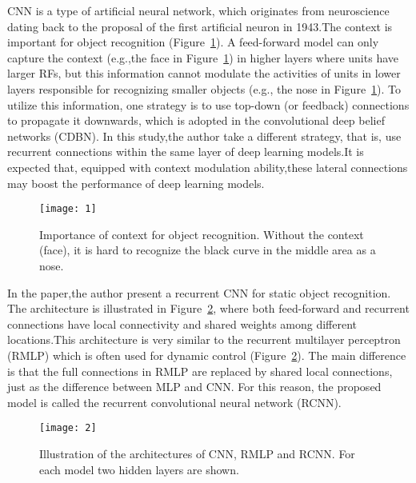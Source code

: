 \documentclass[10pt,twocolumn,letterpaper]{article}
\begin{document}
CNN is a type of artificial neural network, which originates from neuroscience dating back to the proposal of the first artificial neuron in 1943.The context is important for object recognition (Figure~\ref{fig:1}). A feed-forward model can only capture the context (e.g.,the face in Figure~\ref{fig:1}) in higher layers where units have larger RFs, but this information cannot modulate the activities of units in lower layers responsible for recognizing smaller objects (e.g., the nose in Figure~\ref{fig:1}). To utilize this information, one strategy is to use top-down (or feedback) connections to propagate it downwards, which is adopted in the convolutional deep belief networks (CDBN). In this study,the author take a different strategy, that is, use recurrent
connections within the same layer of deep learning models.It is expected that, equipped with context modulation ability,these lateral connections may boost the performance of deep learning models.
\begin{figure}
\centering
\texttt{[image: 1]}
\caption{Importance of context for object recognition. Without the context (face), it is hard to recognize the black curve in the middle area as a nose.}
\label{fig:1}
\end{figure}
In the paper,the author present a recurrent CNN for static object
recognition. The architecture is illustrated in Figure~\ref{fig:2}, where both feed-forward and recurrent connections have local connectivity and shared weights among different locations.This architecture is very similar to the recurrent multilayer perceptron (RMLP) which is often used for dynamic control \cite{Fernandez1990Nonlinear}\cite{Puskorius1994Neurocontrol} (Figure~\ref{fig:2}). The main difference is that the full connections in RMLP are replaced by shared local connections, just as the difference between MLP and CNN. For this reason, the proposed model is called the recurrent convolutional neural network (RCNN).
\begin{figure}
\centering
\texttt{[image: 2]}
\caption{Illustration of the architectures of CNN, RMLP and RCNN. For each model two hidden layers are shown.}
\label{fig:2}
\end{figure}
\end{document}
